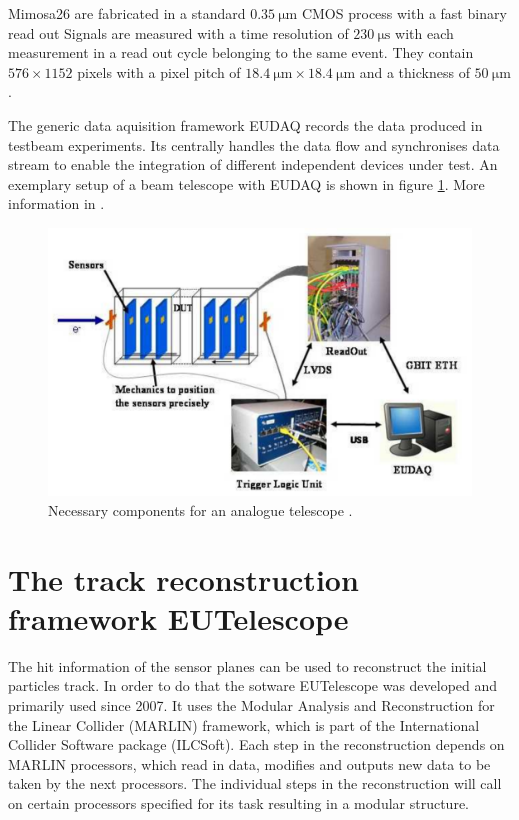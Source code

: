 Mimosa26 are fabricated in a standard $\SI{0.35}{\micro\meter}$ CMOS process with a fast binary read out
Signals are measured with a time resolution of $\SI{230}{\micro\second}$ with each measurement in a read out cycle belonging to the same event.
They contain $576 \times 1152$ pixels with a pixel pitch of $\SI{18.4}{\micro\meter} \times \SI{18.4}{\micro\meter}$
and a thickness of $\SI{50}{\micro\meter}$.

The generic data aquisition framework EUDAQ records the data produced in testbeam experiments. Its centrally handles the data flow and synchronises data stream to enable
the integration of different independent devices under test. An exemplary setup of a beam telescope with EUDAQ is shown in figure \ref{fig:eudaq_bild}.
More information in \cite{eudaq}.

\begin{figure}
  \centering
  \includegraphics[height=0.4\textwidth]{images/eudaq.png}
  \caption{Necessary components for an analogue telescope \cite{eudaq_bild}.}
  \label{fig:eudaq_bild}
\end{figure}

\chapter{The track reconstruction framework EUTelescope}
The hit information of the sensor planes can be used to reconstruct the initial particles track. In order to do that the sotware EUTelescope was developed and
primarily used since 2007. It uses the Modular Analysis and Reconstruction for the Linear Collider (MARLIN) framework, which is part of the
International Collider Software package (ILCSoft). Each step in the reconstruction depends on MARLIN processors, which read in data, modifies and outputs new data to be
taken by the next processors. The individual steps in the reconstruction will call on certain processors specified for its task resulting in a
modular structure.

